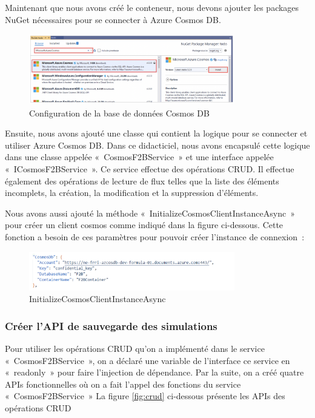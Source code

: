 Maintenant que nous avons créé le conteneur, nous devons ajouter les packages NuGet nécessaires pour se connecter à Azure Cosmos DB.

\begin{figure}[!ht]\centering
\includegraphics[width=0.8\textwidth]{chapitres/chapitre4/figures/CosmosDB.png}
\caption{Configuration de la base de données Cosmos DB}
\label{fig:git}
\end{figure}

\newpage
Ensuite, nous avons ajouté une classe qui contient la logique pour se connecter et utiliser Azure Cosmos DB. Dans ce didacticiel, nous avons encapsulé cette logique dans une classe appelée « CosmosF2BService » et une interface appelée « ICosmosF2BService ». Ce service effectue des opérations CRUD. Il effectue également des opérations de lecture de flux telles que la liste des éléments incomplets, la création, la modification et la suppression d'éléments.

Nous avons aussi ajouté la méthode « InitializeCosmosClientInstanceAsync » pour créer un client cosmos comme indiqué dans la figure ci-dessous. Cette fonction a besoin de ces paramètres pour pouvoir créer l’instance de connexion :
\begin{figure}[!ht]\centering
\includegraphics[width=0.8\textwidth]{chapitres/chapitre4/figures/CosmosDb-azure.png}
\caption{InitializeCosmosClientInstanceAsync}
\label{fig:git}
\end{figure}

\subsubsection{Créer l’API de sauvegarde des simulations}
Pour utiliser les opérations CRUD qu’on a implémenté dans le service « CosmosF2BService », on a déclaré une variable de l’interface ce service en « readonly » pour faire l’injection de dépendance. Par la suite, on a créé quatre APIs fonctionnelles où on a fait l’appel des fonctions du service « CosmosF2BService »
La figure \ref{fig:crud} ci-dessous présente les APIs des opérations CRUD

